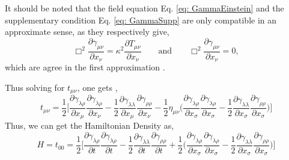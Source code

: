 \documentclass[12pt,a4paper]{report}
\theoremstyle{plain}
\theoremstyle{definition}
\theoremstyle{remark}
\newcommand{\mink}{\eta_{\mu\nu}}
\newcommand{\munu}{\mu\nu}
\begin{document}
It should be noted that the field equation Eq. \ref{eq: GammaEinstein} and the supplementary condition Eq. \ref{eq: GammaSupp} are only compatible in an approximate sense, as they respectively give,
\begin{equation}
    \Box^2\frac{\partial\gamma_{\munu}}{\partial x_{\nu}} = \kappa^2 \frac{\partial T_{\munu}}{\partial x_{\nu}} \qquad \text{and} \qquad \Box^2\frac{\partial\gamma_{\munu}}{\partial x_{\nu}} =  0,
\end{equation}
which are agree in the first approximation \cite{Gupta_1952}.

Thus solving for $t_{\munu}$, one gets \cite{Gupta_1952},
\begin{equation}
    t_{\munu} = \frac{1}{2}\Bigg[\frac{\partial\gamma_{\lambda\rho}}{\partial x_{\mu}}\frac{\partial\gamma_{\lambda\rho}}{\partial x_{\nu}} - \frac{1}{2}\frac{\partial\gamma_{\lambda\lambda}}{\partial x_{\mu}}\frac{\partial\gamma_{\rho\rho}}{\partial x_{\nu}} - \frac{1}{2}\mink\Bigg(\frac{\partial\gamma_{\lambda\rho}}{\partial x_{\sigma}}\frac{\partial\gamma_{\lambda\rho}}{\partial x_{\sigma}} - \frac{1}{2}\frac{\partial\gamma_{\lambda\lambda}}{\partial x_{\sigma}}\frac{\partial\gamma_{\rho\rho}}{\partial x_{\sigma}}\Bigg)\Bigg]
    \label{eq: PseudoStEnergyDen3}
\end{equation}
Thus, we can get the Hamiltonian Density as,
\begin{equation}
    H = t_{00} = \frac{1}{2}\Bigg[\frac{\partial\gamma_{\lambda\rho}}{\partial t}\frac{\partial\gamma_{\lambda\rho}}{\partial t} - \frac{1}{2}\frac{\partial\gamma_{\lambda\lambda}}{\partial t}\frac{\partial\gamma_{\rho\rho}}{\partial t} + \frac{1}{2}\Bigg(\frac{\partial\gamma_{\lambda\rho}}{\partial x_{\sigma}}\frac{\partial\gamma_{\lambda\rho}}{\partial x_{\sigma}} - \frac{1}{2}\frac{\partial\gamma_{\lambda\lambda}}{\partial x_{\sigma}}\frac{\partial\gamma_{\rho\rho}}{\partial x_{\sigma}}\Bigg)\Bigg]
\end{equation}
\end{document}
